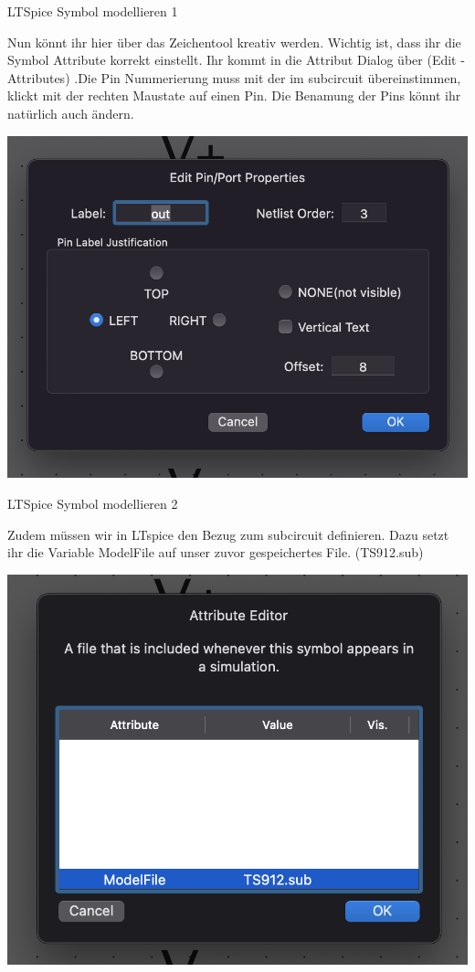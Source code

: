 \begin{frame}[t]{LTSpice Symbol modellieren 1} 

    Nun könnt ihr hier über das Zeichentool kreativ werden.
    Wichtig ist, dass ihr die Symbol Attribute korrekt einstellt. Ihr kommt in
    die Attribut Dialog über (Edit -\> Attributes) .Die Pin Nummerierung muss 
    mit der im subcircuit übereinstimmen, klickt mit der rechten Maustate auf einen Pin.
    Die Benamung der Pins könnt ihr natürlich auch ändern.

    \begin{spacing}{0.9} \begin{tiny}
        \begin{minipage}{\textwidth}
          \includegraphics[width=0.6\linewidth]{pictures/pinNummerierung.png}
        \end{minipage}
    \end{tiny} \end{spacing}

\end{frame}


\begin{frame}[t]{LTSpice Symbol modellieren 2} 

    Zudem müssen wir in LTspice den Bezug zum subcircuit definieren. Dazu setzt ihr die
    Variable ModelFile auf unser zuvor gespeichertes File. (TS912.sub)

    \begin{spacing}{0.9} \begin{tiny}
        \begin{minipage}{\textwidth}
          \includegraphics[width=0.6\linewidth]{pictures/spiceModel.png}
        \end{minipage}
    \end{tiny} \end{spacing}

\end{frame}

